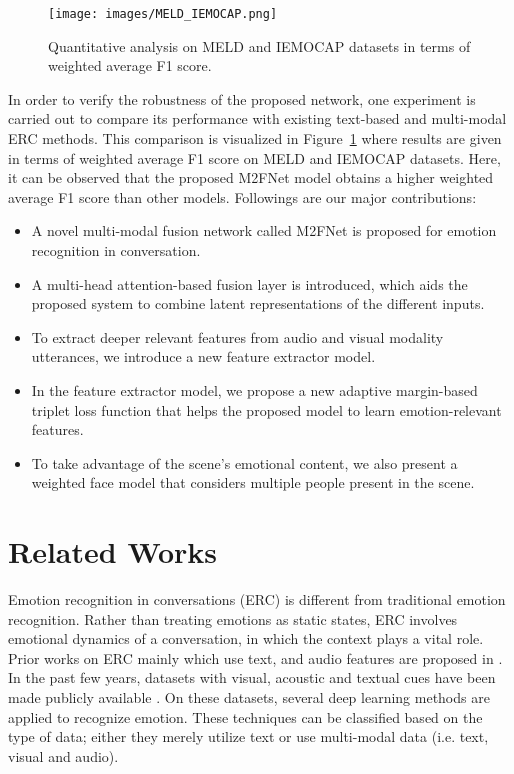 \documentclass[10pt,twocolumn,letterpaper]{article}
\begin{document}
\begin{figure}[t!]
    \centering
    \texttt{[image: images/MELD\_IEMOCAP.png]}
    \caption{Quantitative analysis on MELD and IEMOCAP datasets in terms of weighted average F1 score.}
    \label{fig:input2}
\end{figure}

In order to verify the robustness of the proposed network, one experiment is carried out to compare its performance with existing text-based and multi-modal ERC methods. This comparison is visualized in Figure~\ref{fig:input2} where results are given in terms of weighted average F1 score on MELD \cite{Busso2008IEMOCAPIE} and IEMOCAP \cite{poria2018meld} datasets. Here, it can be observed that the proposed M2FNet model obtains a higher weighted average F1 score than other models. 
Followings are our major contributions:
\begin{itemize}
    \item A novel multi-modal fusion network called M2FNet is proposed for emotion recognition in conversation.
    \item A multi-head attention-based fusion layer is introduced, which aids the proposed system to combine latent representations of the different inputs.
    \item To extract deeper relevant features from audio and visual modality utterances, we introduce a new feature extractor model. 
    \item In the feature extractor model, we propose a new adaptive margin-based triplet loss function that helps the proposed model to learn emotion-relevant features.  
    \item To take advantage of the scene's emotional content, we also present a weighted face model that considers multiple people present in the scene.
\end{itemize}

\section{Related Works}
Emotion recognition in conversations (ERC) is different from traditional emotion recognition. Rather than treating emotions as static states, ERC involves emotional dynamics of a conversation, in which the context plays a vital role. Prior works on ERC mainly which use text, and audio features are proposed in \cite{lee2005toward, devillers2006real}. In the past few years, datasets with visual, acoustic and textual cues have been made publicly available \cite{Busso2008IEMOCAPIE, poria2018meld}. On these datasets, several deep learning methods are applied to recognize emotion. These techniques can be classified based on the type of data; either they merely utilize text or use multi-modal data (i.e. text, visual and audio). 
\end{document}
